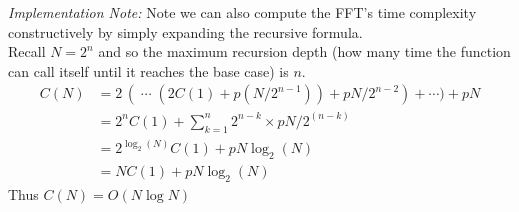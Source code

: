 




\noindent\textit{Implementation Note: }
Note we can also compute the FFT's time complexity constructively by simply expanding the recursive formula.\\

Recall $N = 2^n$ and so the maximum recursion depth (how many time the function can call itself until it reaches the base case) is $n$.
\begin{align*}
C(N) &= 2\,(\;\cdots\; (2C(1) + p(N/2^{n-1})) + pN/2^{n-2}) + \cdots ) + pN\\
     &= 2^{n}C(1) + \sum^n_{k=1} 2^{n-k} \times pN/2^{(n-k)}\\
     &= 2^{\log_2(N)}C(1) + pN\log_2(N)\\
     &= NC(1) + pN\log_2(N)
\end{align*}
Thus $C(N) = O(N \log N)$

